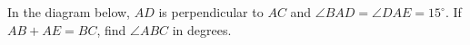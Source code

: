 In the diagram below, $AD$ is perpendicular to $AC$ and $\angle BAD = \angle DAE = 15^\circ$. If $AB + AE = BC$, find $\angle ABC$ in degrees.
